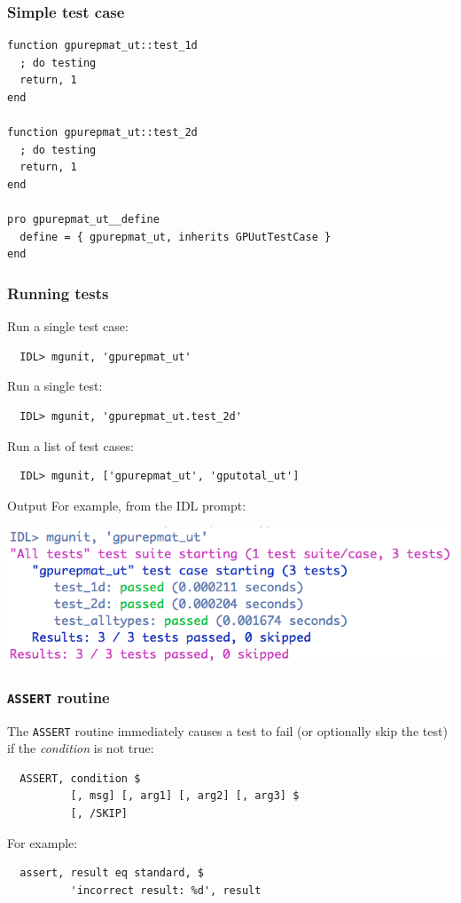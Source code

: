 \documentclass[12pt, handout]{beamer}
\begin{document}
\begin{frame}[t, fragile]
  \frametitle{Simple test case}

\begin{lstlisting}[basicstyle=\ttfamily\fontsize{10pt}{10pt}\selectfont]
function gpurepmat_ut::test_1d
  ; do testing
  return, 1
end

function gpurepmat_ut::test_2d
  ; do testing
  return, 1
end

pro gpurepmat_ut__define
  define = { gpurepmat_ut, inherits GPUutTestCase }
end
\end{lstlisting}

\end{frame}


\begin{frame}[t, fragile]
  \frametitle{Running tests}

Run a single test case:
\begin{lstlisting}
  IDL> mgunit, 'gpurepmat_ut'
\end{lstlisting}
Run a single test:
\begin{lstlisting}
  IDL> mgunit, 'gpurepmat_ut.test_2d'
\end{lstlisting}
Run a list of test cases:
\begin{lstlisting}
  IDL> mgunit, ['gpurepmat_ut', 'gputotal_ut']
\end{lstlisting}

\end{frame}

\begin{frame}{Output}
For example, from the IDL prompt:
\begin{center}
  \includegraphics[scale=0.45]{cli-output.png}
\end{center}
\end{frame}

\begin{frame}[t, fragile]
  \frametitle{{\tt ASSERT} routine}

The {\tt ASSERT} routine immediately causes a test to fail (or optionally skip the test) if the {\em condition} is not true:
\begin{lstlisting}
  ASSERT, condition $
          [, msg] [, arg1] [, arg2] [, arg3] $
          [, /SKIP]
\end{lstlisting}
For example:
\begin{lstlisting}
  assert, result eq standard, $
          'incorrect result: %d', result
\end{lstlisting}

\end{frame}
\end{document}
